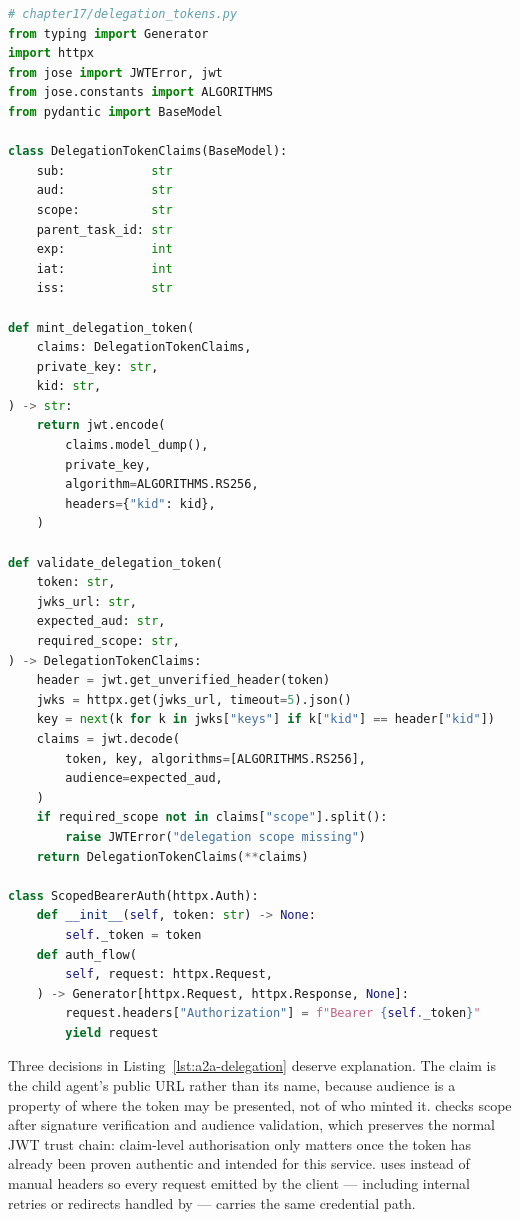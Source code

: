 \begin{lstlisting}[language=Python,
  caption={Scoped delegation token: mint, validate, inject},
  label={lst:a2a-delegation}]
# chapter17/delegation_tokens.py
from typing import Generator
import httpx
from jose import JWTError, jwt
from jose.constants import ALGORITHMS
from pydantic import BaseModel

class DelegationTokenClaims(BaseModel):
    sub:            str
    aud:            str
    scope:          str
    parent_task_id: str
    exp:            int
    iat:            int
    iss:            str

def mint_delegation_token(
    claims: DelegationTokenClaims,
    private_key: str,
    kid: str,
) -> str:
    return jwt.encode(
        claims.model_dump(),
        private_key,
        algorithm=ALGORITHMS.RS256,
        headers={"kid": kid},
    )

def validate_delegation_token(
    token: str,
    jwks_url: str,
    expected_aud: str,
    required_scope: str,
) -> DelegationTokenClaims:
    header = jwt.get_unverified_header(token)
    jwks = httpx.get(jwks_url, timeout=5).json()
    key = next(k for k in jwks["keys"] if k["kid"] == header["kid"])
    claims = jwt.decode(
        token, key, algorithms=[ALGORITHMS.RS256],
        audience=expected_aud,
    )
    if required_scope not in claims["scope"].split():
        raise JWTError("delegation scope missing")
    return DelegationTokenClaims(**claims)

class ScopedBearerAuth(httpx.Auth):
    def __init__(self, token: str) -> None:
        self._token = token
    def auth_flow(
        self, request: httpx.Request,
    ) -> Generator[httpx.Request, httpx.Response, None]:
        request.headers["Authorization"] = f"Bearer {self._token}"
        yield request
\end{lstlisting}

Three decisions in Listing~\ref{lst:a2a-delegation} deserve explanation.
The  claim is the child agent's public URL rather than its name,
because audience is a property of where the token may be presented, not of
who minted it.  checks scope after
signature verification and audience validation, which preserves the normal
JWT trust chain: claim-level authorisation only matters once the token has
already been proven authentic and intended for this service.
 uses  instead of manual headers so
every request emitted by the client --- including internal retries or
redirects handled by  --- carries the same credential path.

